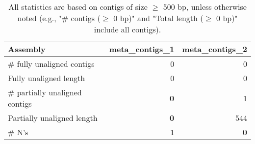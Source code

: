 \documentclass[12pt,a4paper]{article}
\begin{document}
\begin{table}[ht]
\begin{center}
\caption{All statistics are based on contigs of size $\geq$ 500 bp, unless otherwise noted (e.g., "\# contigs ($\geq$ 0 bp)" and "Total length ($\geq$ 0 bp)" include all contigs).}
\begin{tabular}{|l*{2}{|r}|}
\hline
Assembly & meta\_contigs\_1 & meta\_contigs\_2 \\ \hline
\# fully unaligned contigs & 0 & 0 \\ \hline
Fully unaligned length & 0 & 0 \\ \hline
\# partially unaligned contigs & {\bf 0} & 1 \\ \hline
Partially unaligned length & {\bf 0} & 544 \\ \hline
\# N's & 1 & {\bf 0} \\ \hline
\end{tabular}
\end{center}
\end{table}
\end{document}
